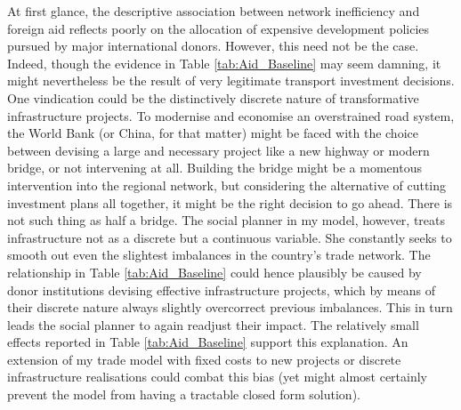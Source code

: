\documentclass[11pt, oneside]{article}   	%
\begin{document}
At first glance, the descriptive association between network inefficiency and foreign aid reflects poorly on the allocation of expensive development policies pursued by major international donors. However, this need not be the case. Indeed, though the evidence in Table \eqref{tab:Aid_Baseline} may seem damning, it might nevertheless be the result of very legitimate transport investment decisions. One vindication could be the distinctively discrete nature of transformative infrastructure projects. To modernise and economise an overstrained road system, the World Bank (or China, for that matter) might be faced with the choice between devising a large and necessary project like a new highway or modern bridge, or not intervening at all. Building the bridge might be a momentous intervention into the regional network, but considering the alternative of cutting investment plans all together, it might be the right decision to go ahead. There is not such thing as half a bridge. The social planner in my model, however, treats infrastructure not as a discrete but a continuous variable. She constantly seeks to smooth out even the slightest imbalances in the country's trade network. The relationship in Table \eqref{tab:Aid_Baseline} could hence plausibly be caused by donor institutions devising effective infrastructure projects, which by means of their discrete nature always slightly overcorrect previous imbalances. This in turn leads the social planner to again readjust their impact. The relatively small effects reported in Table \eqref{tab:Aid_Baseline} support this explanation. An extension of my trade model with fixed costs to new projects or discrete infrastructure realisations could combat this bias (yet might almost certainly prevent the model from having a tractable closed form solution).
\end{document}

